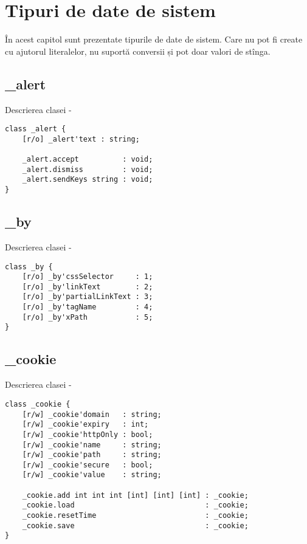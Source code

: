 \section{Tipuri de date de sistem}

În acest capitol sunt prezentate tipurile de date de sistem. Care nu pot fi create cu ajutorul literalelor, nu suportă conversii și pot doar valori de stînga.

\subsection{{\color{orange} \_alert}}

\noindent Descrierea clasei  -
\begin{lstlisting}[numbers=none]
class _alert {
	[r/o] _alert'text : string;
	
	_alert.accept          : void;
	_alert.dismiss         : void;
	_alert.sendKeys string : void;
}
\end{lstlisting}

\subsection{{\color{orange} \_by}}

\noindent Descrierea clasei  -
\begin{lstlisting}[numbers=none]
class _by {
	[r/o] _by'cssSelector     : 1;
	[r/o] _by'linkText        : 2;
	[r/o] _by'partialLinkText : 3;
	[r/o] _by'tagName         : 4;
	[r/o] _by'xPath           : 5;
}
\end{lstlisting}

\subsection{{\color{orange} \_cookie}}

\noindent Descrierea clasei  -
\begin{lstlisting}[numbers=none]
class _cookie {
	[r/w] _cookie'domain   : string;
	[r/w] _cookie'expiry   : int;
	[r/w] _cookie'httpOnly : bool;
	[r/w] _cookie'name     : string;
	[r/w] _cookie'path     : string;
	[r/w] _cookie'secure   : bool;
	[r/w] _cookie'value    : string;
	
	_cookie.add int int int [int] [int] [int] : _cookie;
	_cookie.load                              : _cookie;
	_cookie.resetTime                         : _cookie;
	_cookie.save                              : _cookie;
}
\end{lstlisting}

